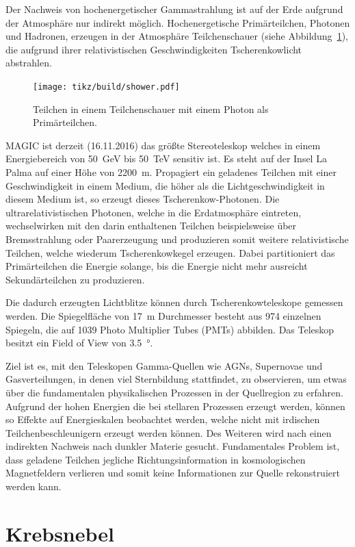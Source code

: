Der Nachweis von hochenergetischer Gammastrahlung ist auf der Erde aufgrund der
Atmosphäre nur indirekt möglich.
Hochenergetische Primärteilchen, Photonen und Hadronen, erzeugen in der Atmosphäre
Teilchenschauer (siehe Abbildung~\ref{fig:schauer}), die aufgrund ihrer relativistischen Geschwindigkeiten Tscherenkowlicht abstrahlen.
\begin{figure}
		\texttt{[image: tikz/build/shower.pdf]}
		\caption{Teilchen in einem Teilchenschauer mit einem Photon als
    Primärteilchen.}%
    \label{fig:schauer}
\end{figure}
MAGIC ist derzeit (16.11.2016) das größte Stereoteleskop
welches in einem Energiebereich von \SI{50}{\giga\electronvolt} bis
\SI{50}{\tera\electronvolt} sensitiv ist.
Es steht auf der Insel La Palma auf einer Höhe von \SI{2200}{\meter}.
Propagiert ein geladenes Teilchen mit einer Geschwindigkeit in einem
Medium, die höher als die Lichtgeschwindigkeit in diesem Medium ist,
so erzeugt dieses Tscherenkow-Photonen.
Die ultrarelativistischen Photonen, welche in die Erdatmosphäre eintreten,
wechselwirken mit den darin enthaltenen Teilchen beispielsweise über
Bremsstrahlung oder Paarerzeugung und produzieren somit weitere
relativistische Teilchen, welche wiederum Tscherenkowkegel erzeugen.
Dabei partitioniert das Primärteilchen die Energie solange, bis die Energie
nicht mehr ausreicht Sekundärteilchen zu produzieren.

Die dadurch erzeugten Lichtblitze können durch Tscherenkowteleskope gemessen
werden.
Die Spiegelfläche von \SI{17}{\meter} Durchmesser besteht aus \num{974} einzelnen
Spiegeln, die auf \num{1039} Photo Multiplier Tubes (PMTs) abbilden.
Das Teleskop besitzt ein Field of View von \SI{3.5}{\degree}.

Ziel ist es, mit den Teleskopen Gamma-Quellen wie AGNs, Supernovae und
Gasverteilungen, in denen viel Sternbildung stattfindet, zu observieren, um etwas
über die fundamentalen physikalischen Prozessen in der Quellregion zu erfahren.
Aufgrund der hohen Energien die bei stellaren Prozessen erzeugt werden, können
so Effekte auf Energieskalen beobachtet werden, welche nicht mit irdischen
Teilchenbeschleunigern erzeugt werden können.
Des Weiteren wird nach einen indirekten Nachweis nach dunkler Materie gesucht.
Fundamentales Problem ist, dass geladene Teilchen jegliche Richtungsinformation
in kosmologischen Magnetfeldern verlieren und somit keine Informationen zur
Quelle rekonstruiert werden kann.

\section*{Krebsnebel}%
\label{sec:krebsnebel}

